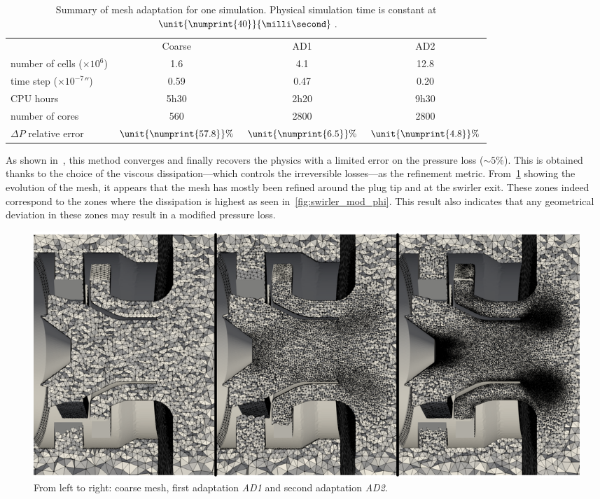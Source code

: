 
\begin{table}[!h]
\centering
\caption{Summary of mesh adaptation for one simulation. Physical simulation time is constant at $\unit{\numprint{40}}{\milli\second}$.}
\begin{tabular}{lccc}
\toprule
 & Coarse & AD1 & AD2  \\
\cmidrule{2-4}
number of cells ($\times10^6$) & 1.6 & 4.1 & 12.8 \\
time step ($\unit{\times10^{-7}}{\second}$) & 0.59 & 0.47 & 0.20\\
CPU hours & 5h30 & 2h20 & 9h30 \\
number of cores & 560 & 2800 & 2800 \\
$\Delta P$ relative error & $\unit{\numprint{57.8}}{\%}$ & $\unit{\numprint{6.5}}{\%}$ & $\unit{\numprint{4.8}}{\%}$\\
\bottomrule
\end{tabular}
\label{tab:summary-mesh}
\end{table}

As shown in~\cite{Daviller2017}, this method converges and finally recovers the physics with a limited error on the pressure loss ($\sim 5$\%). This is obtained thanks to the choice of the viscous dissipation---which controls the irreversible losses---as the refinement metric. From~\cref{fig:mesh-AD-1-2} showing the evolution of the mesh, it appears that the mesh has mostly been refined around the plug tip and at the swirler exit. These zones indeed correspond to the zones where the dissipation is highest as seen in~\cref{fig:swirler_mod_phi}. This result also indicates that any geometrical deviation in these zones may result in a modified pressure loss. %

\begin{figure}[!h]
\centering
\includegraphics[width=\linewidth,keepaspectratio]{fig/applications/swirler/mesh_init-AD_1-2.pdf}
\caption{From left to right: coarse mesh, first adaptation \emph{AD1} and second adaptation \emph{AD2}.}
\label{fig:mesh-AD-1-2}
\end{figure}


